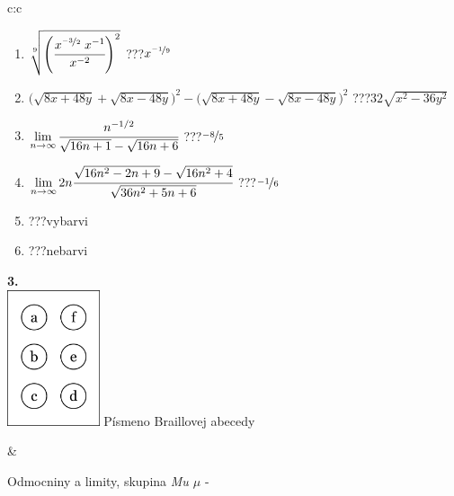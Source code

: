 \documentclass[10pt]{report}
\begin{document}
\begin{tabular}{c:c}
\begin{minipage}[c][104.5mm][t]{0.5\linewidth}
\begin{center}
\begin{minipage}{0.79\linewidth}
\begin{center}
\begin{varwidth}{\linewidth}
\begin{enumerate}
\small
\item $\sqrt[9]{\left(\cfrac{x^{\nicefrac{-3}{2}}\;x^{-1}}{x^{-2}}\right)^{2}}$\quad \dotfill\; ???\;\dotfill \quad $x^{\nicefrac{-1}{9}}$
\item {\footnotesize{\scriptsize$\big(\sqrt{8x+48y}+\sqrt{8x-48y}\big)^2-\big(\sqrt{8x+48y}-\sqrt{8x-48y}\big)^2$}\quad \dotfill\; ???\;\dotfill \quad $32\sqrt{x^2-36y^2}$}
\item $\lim\limits_{n\to\infty}\cfrac{n^{-1/2}}{\sqrt{16n+1}-\sqrt{16n+6}}$\quad \dotfill\; ???\;\dotfill \quad $\nicefrac{-8}{5}$
\item $\lim\limits_{n\to\infty}2n\cfrac{\sqrt{16n^2-2n+9}-\sqrt{16n^2+4}}{\sqrt{36n^2+5n+6}}$\quad \dotfill\; ???\;\dotfill \quad $\nicefrac{-1}{6}$
\item \quad \dotfill\; ???\;\dotfill \quad vybarvi
\item \quad \dotfill\; ???\;\dotfill \quad nebarvi
\end{enumerate}
\end{varwidth}
\end{center}
\end{minipage}
\begin{minipage}{0.20\linewidth}
\begin{center}
{\Huge\bfseries 3.} \\[2mm]
\includegraphics[height=40mm]{../images/braille.png}
{\small Písmeno Braillovej abecedy}
\end{center}
\end{minipage}
\end{center}
\end{minipage}
&
\begin{minipage}[c][104.5mm][t]{0.5\linewidth}
\begin{center}
\vspace{7mm}
{\huge Odmocniny a limity, skupina \textit{Mu $\mu$} -}\\[5mm]

\end{center}
\end{minipage}
\end{tabular}
\end{document}

